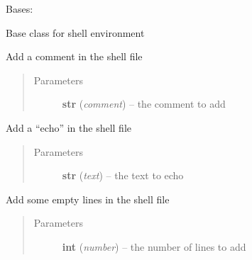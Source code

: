 \documentclass[a4paper,10pt,english]{sphinxmanual}
\begin{document}
\begin{fulllineitems}
\label{commands/apidoc/src:src.fileEnviron.FileEnviron}
Bases: 

Base class for shell environment

\begin{fulllineitems}
\label{commands/apidoc/src:src.fileEnviron.FileEnviron.add_comment}
Add a comment in the shell file
\begin{quote}\begin{description}
\item[{Parameters}] \leavevmode
\textbf{str} (\emph{comment}) -- the comment to add

\end{description}\end{quote}

\end{fulllineitems}


\begin{fulllineitems}
\label{commands/apidoc/src:src.fileEnviron.FileEnviron.add_echo}
Add a ``echo'' in the shell file
\begin{quote}\begin{description}
\item[{Parameters}] \leavevmode
\textbf{str} (\emph{text}) -- the text to echo

\end{description}\end{quote}

\end{fulllineitems}


\begin{fulllineitems}
\label{commands/apidoc/src:src.fileEnviron.FileEnviron.add_line}
Add some empty lines in the shell file
\begin{quote}\begin{description}
\item[{Parameters}] \leavevmode
\textbf{int} (\emph{number}) -- the number of lines to add


\end{description}
\end{quote}
\end{fulllineitems}
\end{fulllineitems}
\end{document}
